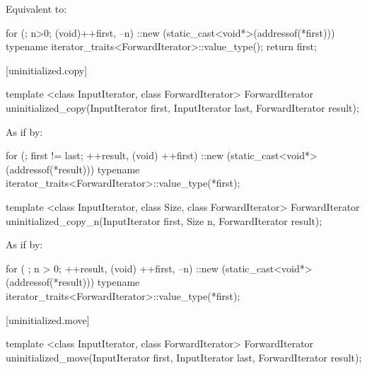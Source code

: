 \begin{itemdescr}
\pnum
\effects
Equivalent to:
\begin{codeblock}
for (; n>0; (void)++first, --n)
  ::new (static_cast<void*>(addressof(*first)))
    typename iterator_traits<ForwardIterator>::value_type();
return first;
\end{codeblock}
\end{itemdescr}

[uninitialized.copy]{}

%
\begin{itemdecl}
template <class InputIterator, class ForwardIterator>
  ForwardIterator uninitialized_copy(InputIterator first, InputIterator last,
                                     ForwardIterator result);
\end{itemdecl}

\begin{itemdescr}
\pnum
\effects
As if by:
\begin{codeblock}
for (; first != last; ++result, (void) ++first)
  ::new (static_cast<void*>(addressof(*result)))
    typename iterator_traits<ForwardIterator>::value_type(*first);
\end{codeblock}

\pnum
\returns
{}
\end{itemdescr}

%
\begin{itemdecl}
template <class InputIterator, class Size, class ForwardIterator>
  ForwardIterator uninitialized_copy_n(InputIterator first, Size n,
                                       ForwardIterator result);
\end{itemdecl}

\begin{itemdescr}
\pnum
\effects
As if by:
\begin{codeblock}
for ( ; n > 0; ++result, (void) ++first, --n) {
  ::new (static_cast<void*>(addressof(*result)))
    typename iterator_traits<ForwardIterator>::value_type(*first);
}
\end{codeblock}

\pnum
\returns {}
\end{itemdescr}

[uninitialized.move]{}

%
\begin{itemdecl}
template <class InputIterator, class ForwardIterator>
  ForwardIterator uninitialized_move(InputIterator first, InputIterator last,
                                     ForwardIterator result);
\end{itemdecl}

